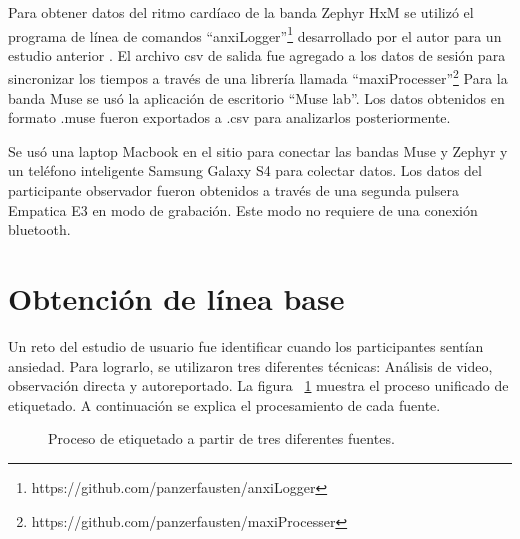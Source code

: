 Para obtener datos del ritmo card\'iaco de la banda Zephyr HxM se utiliz\'o el programa de l\'inea de comandos ``anxiLogger''\footnote{https://github.com/panzerfausten/anxiLogger} desarrollado por el autor para un estudio anterior \citep{Miranda}. El archivo csv de salida fue agregado a los datos de sesi\'on para sincronizar los tiempos a trav\'es de una librer\'ia llamada ``maxiProcesser''\footnote{https://github.com/panzerfausten/maxiProcesser}
	Para la banda Muse se us\'o la aplicaci\'on de escritorio ``Muse lab''. Los datos obtenidos en formato .muse fueron exportados a .csv para analizarlos posteriormente.

	Se us\'o una laptop Macbook en el sitio para conectar las bandas Muse y Zephyr y un tel\'efono inteligente Samsung Galaxy S4 para colectar datos. Los datos del participante observador fueron obtenidos a trav\'es de una segunda pulsera Empatica E3 en modo de grabaci\'on. Este modo no requiere de una conexi\'on bluetooth.


\section{Obtenci\'on de l\'inea base}\label{secc:dataanalysis}
Un reto del estudio de usuario fue identificar cuando los participantes sent\'ian ansiedad. Para lograrlo, se utilizaron tres diferentes t\'ecnicas: An\'alisis de video, observaci\'on directa y autoreportado. La figura ~\ref{fig:labeling} muestra el proceso unificado de etiquetado. A continuaci\'on se explica el procesamiento de cada fuente.

\begin{figure}[h]
        \centering
	\caption{Proceso de etiquetado a partir de tres diferentes fuentes.}\label{fig:labeling}
\end{figure}
